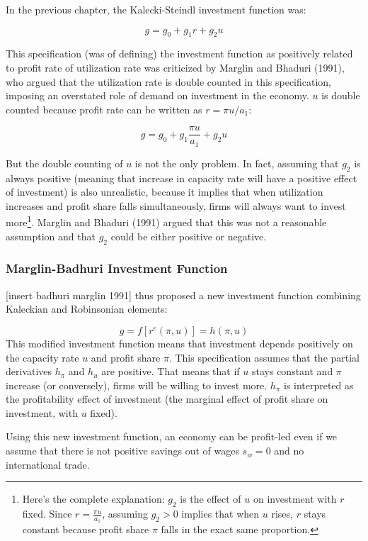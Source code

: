 \documentclass[
  letterpaper,
  DIV=11,
  numbers=noendperiod]{scrreprt}
\begin{document}
In the previous chapter, the Kalecki-Steindl investment function was:

\[g=g_0+g_1r+g_2u\]

This specification (was of defining) the investment function as
positively related to profit rate of utilization rate was criticized by
Marglin and Bhaduri (1991), who argued that the utilization rate is
double counted in this specification, imposing an overstated role of
demand on investment in the economy. \(u\) is double counted because
profit rate can be written as \(r = \pi u/a_1\):

\[g=g_0+g_1\frac{\pi u}{a_1}+g_2u\]

But the double counting of \(u\) is not the only problem. In fact,
assuming that \(g_2\) is always positive (meaning that increase in
capacity rate will have a positive effect of investment) is also
unrealistic, because it implies that when utilization increases and
profit share falls simultaneously, firms will always want to invest
more\footnote{Here's the complete explanation: \(g_2\) is the effect of
  \(u\) on investment with \(r\) fixed. Since \(r = \frac{\pi u}{a_1}\),
  assuming \(g_2>0\) implies that when \(u\) rises, \(r\) stays constant
  because profit share \(\pi\) falls in the exact same proportion.}.
Marglin and Bhaduri (1991) argued that this was not a reasonable
assumption and that \(g_2\) could be either positive or negative.

\hypertarget{marglin-badhuri-investment-function}{%
\subsubsection{Marglin-Badhuri Investment
Function}\label{marglin-badhuri-investment-function}}

{[}insert badhuri marglin 1991{]} thus proposed a new investment
function combining Kaleckian and Robinsonian elements:

\[g = f[r^e(\pi,u)] = h(\pi,u)\] This modified investment function means
that investment depends positively on the capacity rate \(u\) and profit
share \(\pi\). This specification assumes that the partial derivatives
\(h_\pi\) and \(h_u\) are positive. That means that if \(u\) stays
constant and \(\pi\) increase (or conversely), firms will be willing to
invest more. \(h_\pi\) is interpreted as the profitability effect of
investment (the marginal effect of profit share on investment, with
\(u\) fixed).

Using this new investment function, an economy can be profit-led even if
we assume that there is not positive savings out of wages \(s_w=0\) and
no international trade.
\end{document}
